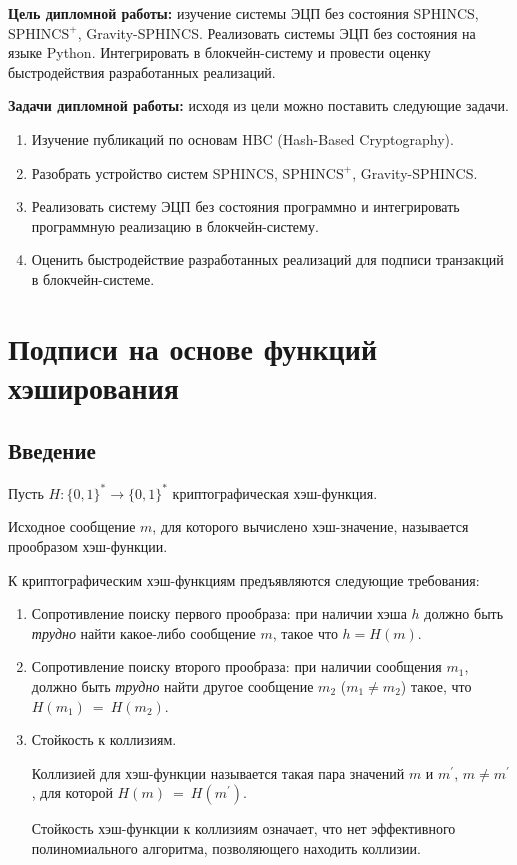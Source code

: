 \documentclass[a4paper, 14pt]{extarticle}
\begin{document}
\textbf{Цель дипломной работы:} изучение системы ЭЦП без состояния SPHINCS, $\text{SPHINCS}^+$, Gravity-SPHINCS. Реализовать системы ЭЦП без состояния на языке Python. Интегрировать в блокчейн-систему и провести оценку быстродействия разработанных реализаций.

\textbf{Задачи дипломной работы:} исходя из цели можно поставить следующие задачи.

\begin{enumerate}
    \item Изучение публикаций по основам HBC (Hash-Based Cryptography).
    \item Разобрать устройство систем SPHINCS, $\text{SPHINCS}^+$, Gravity-SPHINCS.
    \item Реализовать систему ЭЦП без состояния программно и интегрировать программную реализацию в блокчейн-систему.
    \item Оценить быстродействие разработанных реализаций для подписи транзакций в блокчейн-системе.
\end{enumerate}

\newpage

\section{Подписи на основе функций хэширования}
\subsection{Введение}
Пусть $H : \{0, 1\}^{*} \rightarrow \{0, 1\}^{*}$ криптографическая хэш-функция.

Исходное сообщение $m$, для которого вычислено хэш-значение, называется прообразом хэш-функции.

К криптографическим хэш-функциям предъявляются следующие требования:

\begin{enumerate}
    \item Сопротивление поиску первого прообраза: при наличии хэша $h$ должно быть \emph{трудно} найти какое-либо сообщение $m$, такое что $h=H(m)$.
    \item Сопротивление поиску второго прообраза: при наличии сообщения $m_{1}$, должно быть \emph{трудно} найти другое сообщение $m_{2}$ ($m_{1} \neq m_{2}$) такое, что $H(m_{1})\ =\ H(m_{2})$.
    \item Стойкость к коллизиям.

    Коллизией для хэш-функции называется такая пара значений $m$ и $m^{'}$, $m \neq m^{'}$, для которой $H(m)\ =\ H(m^{'})$.

    Стойкость хэш-функции к коллизиям означает, что нет эффективного полиномиального алгоритма, позволяющего находить коллизии.
\end{enumerate}
\end{document}
